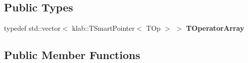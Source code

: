 \subsection*{Public Types}
\begin{DoxyCompactItemize}
\item 
typedef std\+::vector$<$ klab\+::\+T\+Smart\+Pointer$<$ T\+Op $>$ $>$ {\bfseries T\+Operator\+Array}\hypertarget{classkl1p_1_1TBlockDiagonalOperator_ad33c7b4cfd584979cb34b4f5c51a16d8}{}\label{classkl1p_1_1TBlockDiagonalOperator_ad33c7b4cfd584979cb34b4f5c51a16d8}

\end{DoxyCompactItemize}
\subsection*{Public Member Functions}
